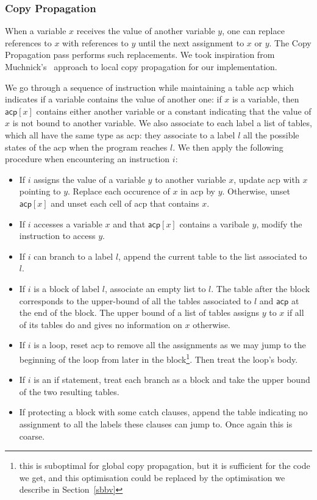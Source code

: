 \documentclass[a4paper,11pt]{article}
\begin{document}
\subsubsection{Copy Propagation}
When a variable $x$ receives the value of another variable $y$, one can replace
references to $x$ with references to $y$ until the next assignment to $x$ or
$y$. The Copy Propagation pass performs such replacements. We took inspiration
from Muchnick's~\cite[Section~12.5]{muchnick1997advanced} approach to local copy
propagation for our implementation.

We go through a sequence of instruction while maintaining a table \textsf{acp}
which indicates if a variable contains the value of another one: if $x$ is a
variable, then $\textsf{acp}[x]$ contains either another variable or a constant
indicating that the value of $x$ is not bound to another variable. We also
associate to each label a list of tables, which all have the same type as
\textsf{acp}: they associate to a label $l$ all the possible states of the
\textsf{acp} when the program reaches $l$. We then apply the following procedure
when encountering an instruction $i$:
\begin{itemize}\setlength{\itemsep}{0pt}
  \item If $i$ assigns the value of a variable $y$ to another variable $x$,
    update \textsf{acp} with $x$ pointing to $y$. Replace each occurence of $x$
    in \textsf{acp} by $y$. Otherwise, unset $\textsf{acp}[x]$ and unset each
    cell of \textsf{acp} that contains $x$.
  \item If $i$ accesses a variable $x$ and that $\textsf{acp}[x]$ contains a varibale $y$,
    modify the instruction to access $y$.
  \item If $i$ can branch to a label $l$, append the current table to
    the list associated to $l$.
  \item If $i$ is a block of label $l$, associate an empty list to $l$. The
    table after the block corresponds to the upper-bound of all the tables
    associated to $l$ and $\textsf{acp}$ at the end of the block. The upper
    bound of a list of tables assigns $y$ to $x$ if all of its tables do and
    gives no information on $x$ otherwise.
  \item If $i$ is a loop, reset \textsf{acp} to remove all the assignments as
    we may jump to the beginning of the loop from later in the
    block\footnote{this is suboptimal for global copy propagation, but it is
    sufficient for the code we get, and this optimisation could be replaced by
    the optimisation we describe in Section~\ref{sbbv}}. Then treat the loop's
    body.
  \item If $i$ is an if statement, treat each branch as a block and
    take the upper bound of the two resulting tables.
  \item If protecting a block with some \textsf{catch} clauses, append
    the table indicating no assignment to all the labels these clauses can jump
    to. Once again this is coarse.
\end{itemize}
\end{document}
